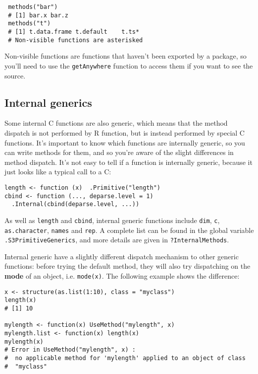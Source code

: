 \begin{verbatim}
 methods("bar")
 # [1] bar.x bar.z
 methods("t")
 # [1] t.data.frame t.default    t.ts*       
 # Non-visible functions are asterisked
\end{verbatim}

Non-visible functions are functions that haven't been exported by a
package, so you'll need to use the \texttt{getAnywhere} function to
access them if you want to see the source.

\hypertarget{internal-generics}{%
\subsection{Internal generics}\label{internal-generics}}

Some internal C functions are also generic, which means that the method
dispatch is not performed by R function, but is instead performed by
special C functions. It's important to know which functions are
internally generic, so you can write methods for them, and so you're
aware of the slight differences in method dispatch. It's not easy to
tell if a function is internally generic, because it just looks like a
typical call to a C:

\begin{verbatim}
length <- function (x)  .Primitive("length")
cbind <- function (..., deparse.level = 1) 
  .Internal(cbind(deparse.level, ...))
\end{verbatim}

As well as \texttt{length} and \texttt{cbind}, internal generic
functions include \texttt{dim}, \texttt{c}, \texttt{as.character},
\texttt{names} and \texttt{rep}. A complete list can be found in the
global variable \texttt{.S3PrimitiveGenerics}, and more details are
given in \texttt{?InternalMethods}.

Internal generic have a slightly different dispatch mechanism to other
generic functions: before trying the default method, they will also try
dispatching on the \textbf{mode} of an object, i.e. \texttt{mode(x)}.
The following example shows the difference:

\begin{verbatim}
x <- structure(as.list(1:10), class = "myclass")
length(x)
# [1] 10

mylength <- function(x) UseMethod("mylength", x)
mylength.list <- function(x) length(x)
mylength(x)
# Error in UseMethod("mylength", x) : 
#  no applicable method for 'mylength' applied to an object of class
#  "myclass"
\end{verbatim}

